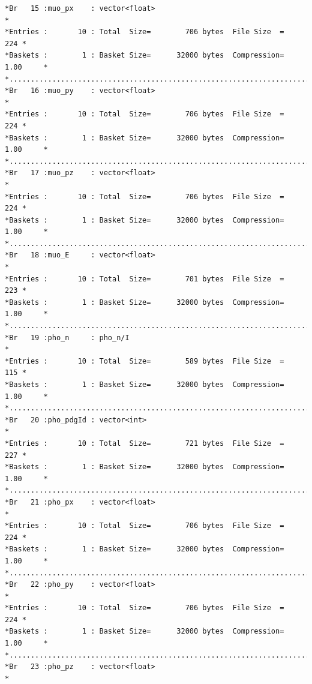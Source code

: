 {\begin{verbatim}
*Br   15 :muo_px    : vector<float>                                          *
*Entries :       10 : Total  Size=        706 bytes  File Size  =        224 *
*Baskets :        1 : Basket Size=      32000 bytes  Compression=   1.00     *
*............................................................................*
*Br   16 :muo_py    : vector<float>                                          *
*Entries :       10 : Total  Size=        706 bytes  File Size  =        224 *
*Baskets :        1 : Basket Size=      32000 bytes  Compression=   1.00     *
*............................................................................*
*Br   17 :muo_pz    : vector<float>                                          *
*Entries :       10 : Total  Size=        706 bytes  File Size  =        224 *
*Baskets :        1 : Basket Size=      32000 bytes  Compression=   1.00     *
*............................................................................*
*Br   18 :muo_E     : vector<float>                                          *
*Entries :       10 : Total  Size=        701 bytes  File Size  =        223 *
*Baskets :        1 : Basket Size=      32000 bytes  Compression=   1.00     *
*............................................................................*
*Br   19 :pho_n     : pho_n/I                                                *
*Entries :       10 : Total  Size=        589 bytes  File Size  =        115 *
*Baskets :        1 : Basket Size=      32000 bytes  Compression=   1.00     *
*............................................................................*
*Br   20 :pho_pdgId : vector<int>                                            *
*Entries :       10 : Total  Size=        721 bytes  File Size  =        227 *
*Baskets :        1 : Basket Size=      32000 bytes  Compression=   1.00     *
*............................................................................*
*Br   21 :pho_px    : vector<float>                                          *
*Entries :       10 : Total  Size=        706 bytes  File Size  =        224 *
*Baskets :        1 : Basket Size=      32000 bytes  Compression=   1.00     *
*............................................................................*
*Br   22 :pho_py    : vector<float>                                          *
*Entries :       10 : Total  Size=        706 bytes  File Size  =        224 *
*Baskets :        1 : Basket Size=      32000 bytes  Compression=   1.00     *
*............................................................................*
*Br   23 :pho_pz    : vector<float>                                          *

\end{verbatim}}
